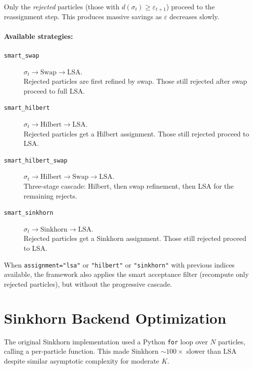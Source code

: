 \documentclass[11pt,a4paper]{article}
\begin{document}
Only the \emph{rejected} particles (those with $d(\sigma_t) \ge \varepsilon_{t+1}$) proceed to the reassignment step. This produces massive savings as $\varepsilon$ decreases slowly.

\paragraph{Available strategies:}

\begin{description}
  \item[\texttt{smart\_swap}] $\sigma_t \to \text{Swap} \to \text{LSA}$. \\
    Rejected particles are first refined by swap. Those still rejected after swap proceed to full LSA.

  \item[\texttt{smart\_hilbert}] $\sigma_t \to \text{Hilbert} \to \text{LSA}$. \\
    Rejected particles get a Hilbert assignment. Those still rejected proceed to LSA.

  \item[\texttt{smart\_hilbert\_swap}] $\sigma_t \to \text{Hilbert} \to \text{Swap} \to \text{LSA}$. \\
    Three-stage cascade: Hilbert, then swap refinement, then LSA for the remaining rejects.

  \item[\texttt{smart\_sinkhorn}] $\sigma_t \to \text{Sinkhorn} \to \text{LSA}$. \\
    Rejected particles get a Sinkhorn assignment. Those still rejected proceed to LSA.
\end{description}

When \texttt{assignment="lsa"} or \texttt{"hilbert"} or \texttt{"sinkhorn"} with previous indices available, the framework also applies the smart acceptance filter (recompute only rejected particles), but without the progressive cascade.

\section{Sinkhorn Backend Optimization}
\label{sec:sinkhorn_opt}

The original Sinkhorn implementation used a Python \texttt{for} loop over $N$ particles, calling a per-particle function. This made Sinkhorn $\sim 100\times$ slower than LSA despite similar asymptotic complexity for moderate $K$.
\end{document}
